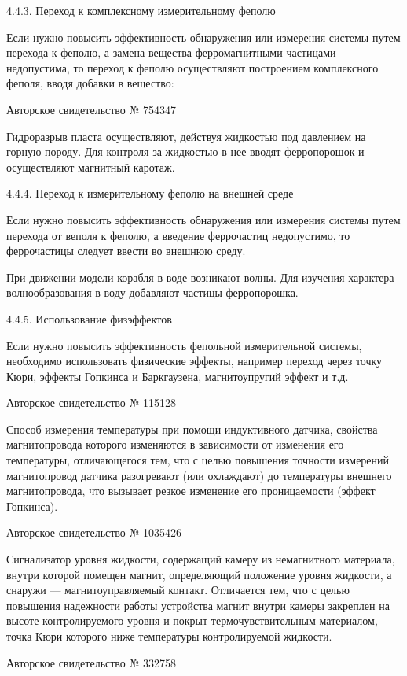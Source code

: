 4.4.3. Переход к комплексному измерительному феполю

Если нужно  повысить эффективность  обнаружения или  измерения системы
путем перехода  к феполю, а замена  вещества ферромагнитными частицами
недопустима, то переход к феполю осуществляют построением комплексного
феполя, вводя добавки в вещество:


Авторское свидетельство № 754347

Гидроразрыв пласта  осуществляют, действуя жидкостью под  давлением на
горную породу. Для  контроля за жидкостью в нее  вводят ферропорошок и
осуществляют магнитный каротаж.


4.4.4. Переход к измерительному феполю на внешней среде

Если нужно  повысить эффективность  обнаружения или  измерения системы
путем перехода от веполя к феполю, а введение феррочастиц недопустимо,
то феррочастицы следует ввести во внешнюю среду.

При  движении модели  корабля  в воде  возникают  волны. Для  изучения
характера волнообразования в воду добавляют частицы ферропорошка.


4.4.5. Использование физэффектов

Если  нужно повысить  эффективность  фепольной измерительной  системы,
необходимо  использовать физические  эффекты,  например переход  через
точку Кюри,  эффекты Гопкинса  и Баркгаузена, магнитоупругий  эффект и
т.д.


Авторское свидетельство № 115128

Способ измерения температуры при помощи индуктивного датчика, свойства
магнитопровода  которого изменяются  в  зависимости  от изменения  его
температуры,  отличающегося  тем,  что   с  целью  повышения  точности
измерений  магнитопровод   датчика  разогревают  (или   охлаждают)  до
температуры внешнего магнитопровода, что вызывает резкое изменение его
проницаемости (эффект Гопкинса).


Авторское свидетельство № 1035426

Сигнализатор  уровня  жидкости,   содержащий  камеру  из  немагнитного
материала,  внутри  которой  помещен  магнит,  определяющий  положение
уровня жидкости,  а снаружи  — магнитоуправляемый  контакт. Отличается
тем,  что  с  целью  повышения  надежности  работы  устройства  магнит
внутри  камеры закреплен  на  высоте контролируемого  уровня и  покрыт
термочувствительным материалом,  точка Кюри которого  ниже температуры
контролируемой жидкости.


Авторское свидетельство № 332758

